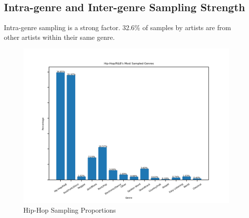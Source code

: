\documentclass[pageno]{jpaper}
\begin{document}
\subsection{Intra-genre and Inter-genre Sampling Strength}
Intra-genre sampling is a strong factor. 32.6\% of samples by artists are from other artists within their same genre.
\begin{figure}[H]
\includegraphics{./genreRatio/genreRatioHiphop}
\caption{Hip-Hop Sampling Proportions}
\centering
\end{figure}
\end{document}
